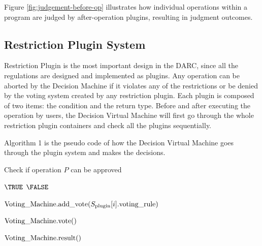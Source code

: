 \documentclass[main.tex]{subfiles}
\begin{document}
Figure \ref{fig:judgement-before-op} illustrates how individual operations within a program are judged by after-operation plugins, resulting in judgment outcomes.





\subsection{Restriction Plugin System}

Restriction Plugin is the most important design in the DARC, since all the regulations are designed and implemented as plugins. Any operation can be aborted by the Decision Machine if it violates any of the restrictions or be denied by the voting system created by any restriction plugin. Each plugin is composed of two items: the condition and the return type. Before and after executing the operation by users, the Decision Virtual Machine will first go through the whole restriction plugin containers and check all the plugins sequentially. 



Algorithm 1 is the pseudo code of how the Decision Virtual Machine goes through the plugin system and makes the decisions.


\begin{algorithm}
\caption{Check if operation $P$ can be approved}
\begin{algorithmic} 


\RETURN $ \TRUE $
\RETURN $ \FALSE $
\ENDIF
\ENDFOR



\STATE ${\text{Voting\textunderscore Machine.add\textunderscore vote(}} S_{\text{plugin}} [i].\text{voting\textunderscore rule} \text{)} $
\ENDIF
\ENDFOR

\STATE $\text{Voting\textunderscore Machine.vote()} $

\RETURN $ \text{Voting\textunderscore Machine.result()} $ 
\end{algorithmic}
\end{algorithm}
\end{document}
